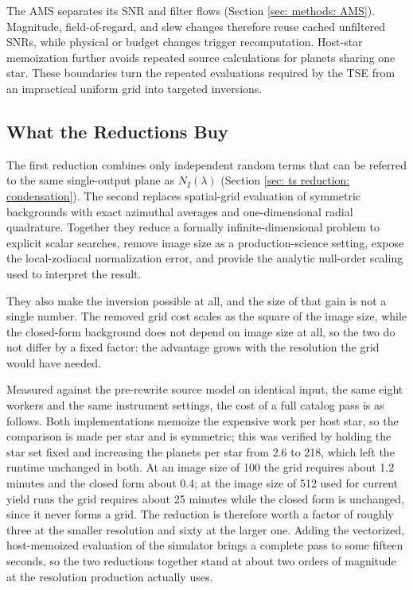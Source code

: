 \documentclass[12pt,a4paper]{article}
\numberwithin{equation}{section}
\numberwithin{figure}{section}
\numberwithin{table}{section}
\begin{document}
The AMS separates its SNR and filter flows (Section \ref{sec: methods: AMS}). Magnitude, field-of-regard, and slew changes therefore reuse cached unfiltered SNRs, while physical or budget changes trigger recomputation. Host-star memoization further avoids repeated source calculations for planets sharing one star. These boundaries turn the repeated evaluations required by the TSE from an impractical uniform grid into targeted inversions.

\subsection{What the Reductions Buy} \label{sec: what reductions buy discussion}
The first reduction combines only independent random terms that can be referred to the same single-output plane as $N_I(\lambda)$ (Section \ref{sec: ts reduction: condensation}). The second replaces spatial-grid evaluation of symmetric backgrounds with exact azimuthal averages and one-dimensional radial quadrature. Together they reduce a formally infinite-dimensional problem to explicit scalar searches, remove image size as a production-science setting, expose the local-zodiacal normalization error, and provide the analytic null-order scaling used to interpret the result.

They also make the inversion possible at all, and the size of that gain is not a single number. The removed grid cost scales as the square of the image size, while the closed-form background does not depend on image size at all, so the two do not differ by a fixed factor: the advantage grows with the resolution the grid would have needed.

Measured against the pre-rewrite source model on identical input, the same eight workers and the same instrument settings, the cost of a full catalog pass is as follows. Both implementations memoize the expensive work per host star, so the comparison is made per star and is symmetric; this was verified by holding the star set fixed and increasing the planets per star from 2.6 to 218, which left the runtime unchanged in both. At an image size of 100 the grid requires about 1.2 minutes and the closed form about 0.4; at the image size of 512 used for current yield runs the grid requires about 25 minutes while the closed form is unchanged, since it never forms a grid. The reduction is therefore worth a factor of roughly three at the smaller resolution and sixty at the larger one. Adding the vectorized, host-memoized evaluation of the simulator brings a complete pass to some fifteen seconds, so the two reductions together stand at about two orders of magnitude at the resolution production actually uses.
\end{document}
